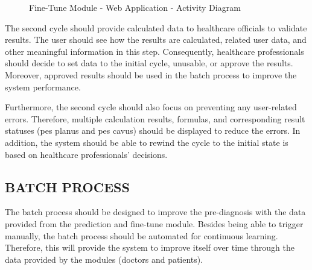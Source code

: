 \begin{figure}[htbp]
\centering
{}
\caption{Fine-Tune Module - Web Application - Activity Diagram}
\label{fig:FineTuneModuleWebApplicationSequenceDiagram}
\end{figure}

The second cycle should provide calculated data to healthcare officials to validate results. The user should see how the results are calculated, related user data, and other meaningful information in this step. Consequently, healthcare professionals should decide to set data to the initial cycle, unusable, or approve the results. Moreover, approved results should be used in the batch process to improve the system performance. 

Furthermore, the second cycle should also focus on preventing any user-related errors. Therefore, multiple calculation results, formulas, and corresponding result statuses (pes planus and pes cavus) should be displayed to reduce the errors. In addition, the system should be able to rewind the cycle to the initial state is based on healthcare professionals' decisions.

\subsection{ BATCH PROCESS }

The batch process should be designed to improve the pre-diagnosis with the data provided from the prediction and fine-tune module. Besides being able to trigger manually, the batch process should be automated for continuous learning. Therefore, this will provide the system to improve itself over time through the data provided by the modules (doctors and patients). 

